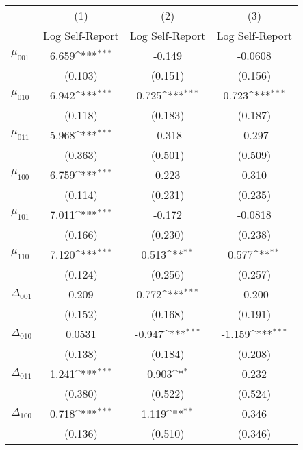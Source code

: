 {
\def\sym#1{\ifmmode^{#1}\else\(^{#1}\)\fi}
\begin{tabular}{l*{3}{c}}
\hline\hline
          &\multicolumn{1}{c}{(1)}&\multicolumn{1}{c}{(2)}&\multicolumn{1}{c}{(3)}\\
          &\multicolumn{1}{c}{Log Self-Report}&\multicolumn{1}{c}{Log Self-Report}&\multicolumn{1}{c}{Log Self-Report}\\
\hline
$\mu_{001}$&    6.659\sym{***}&   -0.149         &  -0.0608         \\
          &  (0.103)         &  (0.151)         &  (0.156)         \\
$\mu_{010}$&    6.942\sym{***}&    0.725\sym{***}&    0.723\sym{***}\\
          &  (0.118)         &  (0.183)         &  (0.187)         \\
$\mu_{011}$&    5.968\sym{***}&   -0.318         &   -0.297         \\
          &  (0.363)         &  (0.501)         &  (0.509)         \\
$\mu_{100}$&    6.759\sym{***}&    0.223         &    0.310         \\
          &  (0.114)         &  (0.231)         &  (0.235)         \\
$\mu_{101}$&    7.011\sym{***}&   -0.172         &  -0.0818         \\
          &  (0.166)         &  (0.230)         &  (0.238)         \\
$\mu_{110}$&    7.120\sym{***}&    0.513\sym{**} &    0.577\sym{**} \\
          &  (0.124)         &  (0.256)         &  (0.257)         \\
$\Delta_{001}$&    0.209         &    0.772\sym{***}&   -0.200         \\
          &  (0.152)         &  (0.168)         &  (0.191)         \\
$\Delta_{010}$&   0.0531         &   -0.947\sym{***}&   -1.159\sym{***}\\
          &  (0.138)         &  (0.184)         &  (0.208)         \\
$\Delta_{011}$&    1.241\sym{***}&    0.903\sym{*}  &    0.232         \\
          &  (0.380)         &  (0.522)         &  (0.524)         \\
$\Delta_{100}$&    0.718\sym{***}&    1.119\sym{**} &    0.346         \\
          &  (0.136)         &  (0.510)         &  (0.346)         \\

\end{tabular}}
